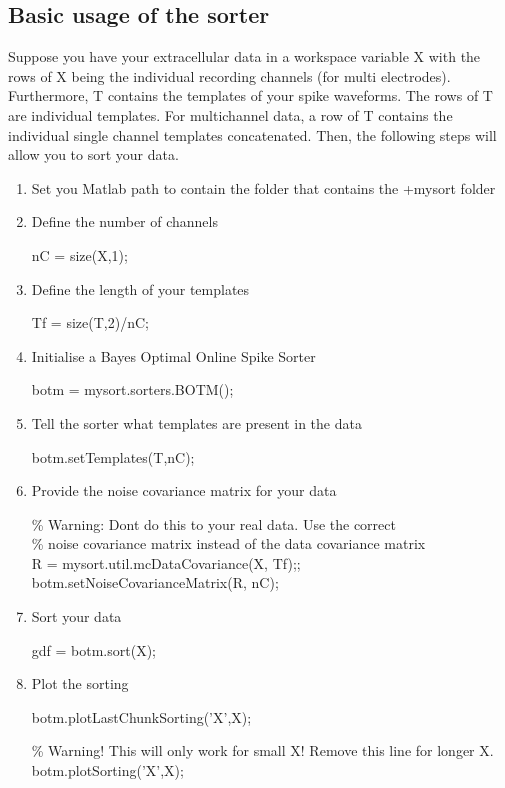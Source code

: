 \documentclass[11pt]{article} %
\begin{document}
\subsection{Basic usage of the sorter}
Suppose you have your extracellular data in a workspace variable X with the rows of X being the individual recording channels (for multi electrodes). Furthermore, T contains the templates of your spike waveforms. The rows of T are individual templates. For multichannel data, a row of T contains the individual single channel templates concatenated. Then, the following steps will allow you to sort your data.

\begin{enumerate}
\item Set you Matlab path to contain the folder that contains the +mysort folder

\item  Define the number of channels

	    nC = size(X,1);

\item  Define the length of your templates

	    Tf = size(T,2)/nC;

\item  Initialise a Bayes Optimal Online Spike Sorter

	    botm = mysort.sorters.BOTM();

\item  Tell the sorter what templates are present in the data

	    botm.setTemplates(T,nC);

\item  Provide the noise covariance matrix for your data

	    \% Warning: Dont do this to your real data. Use the correct \\
             \% noise covariance matrix instead of the data covariance matrix\\
	    R = mysort.util.mcDataCovariance(X, Tf);;\\
	    botm.setNoiseCovarianceMatrix(R, nC);

\item  Sort your data

	    gdf = botm.sort(X);

\item Plot the sorting

	    botm.plotLastChunkSorting('X',X); 

	    \% Warning! This will only work for small X! Remove this line for longer X.
	    botm.plotSorting('X',X);
\end{enumerate}
\end{document}
